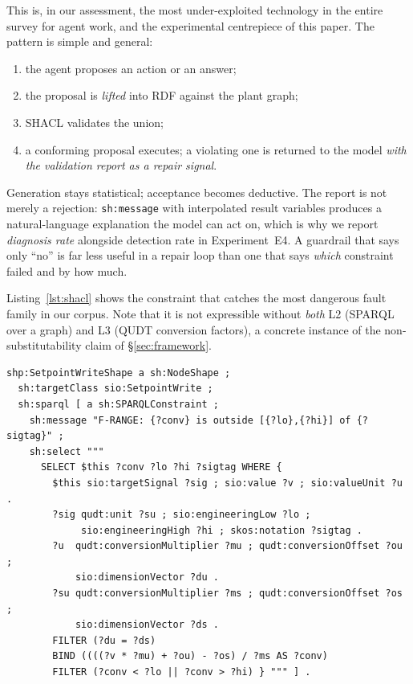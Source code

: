 This is, in our assessment, the most under-exploited technology in the entire
survey for agent work, and the experimental centrepiece of this paper. The
pattern is simple and general:

\begin{enumerate}[label=\textbf{\arabic*.}]
  \item the agent proposes an action or an answer;
  \item the proposal is \emph{lifted} into RDF against the plant graph;
  \item SHACL validates the union;
  \item a conforming proposal executes; a violating one is returned to the model
  \emph{with the validation report as a repair signal}.
\end{enumerate}

Generation stays statistical; acceptance becomes deductive. The report is not
merely a rejection: \texttt{sh:message} with interpolated result variables
produces a natural-language explanation the model can act on, which is why we
report \emph{diagnosis rate} alongside detection rate in Experiment~E4. A
guardrail that says only ``no'' is far less useful in a repair loop than one
that says \emph{which} constraint failed and by how much.

Listing~\ref{lst:shacl} shows the constraint that catches the most dangerous
fault family in our corpus. Note that it is not expressible without \emph{both}
L2 (SPARQL over a graph) and L3 (QUDT conversion factors), a concrete instance
of the non-substitutability claim of \S\ref{sec:framework}.

\begin{lstlisting}[language=turtle,float=*,floatplacement=t,caption={A unit-aware
range constraint. The proposed value is converted into the signal's own unit
through the QUDT affine conversion before the engineering range is applied. A
validator without unit semantics either accepts a value that is out of range (a
false negative) or rejects a legal value expressed in a different unit (a false
alarm). In Experiment~E4, tier~G2 does both.},label={lst:shacl}]
shp:SetpointWriteShape a sh:NodeShape ;
  sh:targetClass sio:SetpointWrite ;
  sh:sparql [ a sh:SPARQLConstraint ;
    sh:message "F-RANGE: {?conv} is outside [{?lo},{?hi}] of {?sigtag}" ;
    sh:select """
      SELECT $this ?conv ?lo ?hi ?sigtag WHERE {
        $this sio:targetSignal ?sig ; sio:value ?v ; sio:valueUnit ?u .
        ?sig qudt:unit ?su ; sio:engineeringLow ?lo ;
             sio:engineeringHigh ?hi ; skos:notation ?sigtag .
        ?u  qudt:conversionMultiplier ?mu ; qudt:conversionOffset ?ou ;
            sio:dimensionVector ?du .
        ?su qudt:conversionMultiplier ?ms ; qudt:conversionOffset ?os ;
            sio:dimensionVector ?ds .
        FILTER (?du = ?ds)
        BIND ((((?v * ?mu) + ?ou) - ?os) / ?ms AS ?conv)
        FILTER (?conv < ?lo || ?conv > ?hi) } """ ] .
\end{lstlisting}

